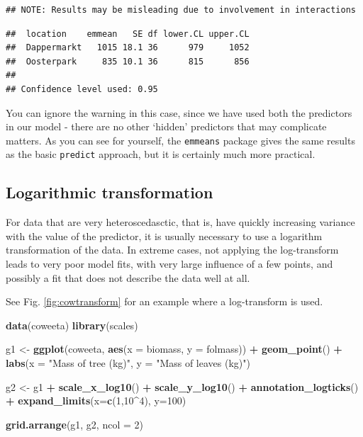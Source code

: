 \documentclass[]{book}
\newenvironment{Shaded}{\begin{snugshade}}{\end{snugshade}}
\newcommand{\DataTypeTok}[1]{\textcolor[rgb]{0.13,0.29,0.53}{#1}}
\newcommand{\DecValTok}[1]{\textcolor[rgb]{0.00,0.00,0.81}{#1}}
\newcommand{\KeywordTok}[1]{\textcolor[rgb]{0.13,0.29,0.53}{\textbf{#1}}}
\newcommand{\NormalTok}[1]{#1}
\newcommand{\OperatorTok}[1]{\textcolor[rgb]{0.81,0.36,0.00}{\textbf{#1}}}
\newcommand{\StringTok}[1]{\textcolor[rgb]{0.31,0.60,0.02}{#1}}
\begin{document}
\begin{verbatim}
## NOTE: Results may be misleading due to involvement in interactions
\end{verbatim}

\begin{verbatim}
##  location    emmean   SE df lower.CL upper.CL
##  Dappermarkt   1015 18.1 36      979     1052
##  Oosterpark     835 10.1 36      815      856
## 
## Confidence level used: 0.95
\end{verbatim}

You can ignore the warning in this case, since we have used both the predictors in our model - there are no other `hidden' predictors that may complicate matters. As you can see for yourself, the \texttt{emmeans} package gives the same results as the basic \texttt{predict} approach, but it is certainly much more practical.

\hypertarget{logtransform}{%
\subsection{Logarithmic transformation}\label{logtransform}}

For data that are very heteroscedasctic, that is, have quickly increasing variance with the value of the predictor, it is usually necessary to use a logarithm transformation of the data. In extreme cases, not applying the log-transform leads to very poor model fits, with very large influence of a few points, and possibly a fit that does not describe the data well at all.

See Fig. \ref{fig:cowtransform} for an example where a log-transform is used.

\begin{Shaded}
\begin{Highlighting}[]
\KeywordTok{data}\NormalTok{(coweeta)}
\KeywordTok{library}\NormalTok{(scales)}

\NormalTok{g1 <-}\StringTok{ }\KeywordTok{ggplot}\NormalTok{(coweeta, }\KeywordTok{aes}\NormalTok{(}\DataTypeTok{x =}\NormalTok{ biomass, }\DataTypeTok{y =}\NormalTok{ folmass)) }\OperatorTok{+}\StringTok{ }
\StringTok{  }\KeywordTok{geom_point}\NormalTok{() }\OperatorTok{+}
\StringTok{  }\KeywordTok{labs}\NormalTok{(}\DataTypeTok{x =} \StringTok{"Mass of tree (kg)"}\NormalTok{, }\DataTypeTok{y =} \StringTok{"Mass of leaves (kg)"}\NormalTok{)}
    
\NormalTok{g2 <-}\StringTok{ }\NormalTok{g1 }\OperatorTok{+}\StringTok{ }
\StringTok{  }\KeywordTok{scale_x_log10}\NormalTok{() }\OperatorTok{+}\StringTok{ }
\StringTok{  }\KeywordTok{scale_y_log10}\NormalTok{() }\OperatorTok{+}
\StringTok{  }\KeywordTok{annotation_logticks}\NormalTok{() }\OperatorTok{+}
\StringTok{  }\KeywordTok{expand_limits}\NormalTok{(}\DataTypeTok{x=}\KeywordTok{c}\NormalTok{(}\DecValTok{1}\NormalTok{,}\DecValTok{10}\OperatorTok{^}\DecValTok{4}\NormalTok{), }\DataTypeTok{y=}\DecValTok{100}\NormalTok{)}

\KeywordTok{grid.arrange}\NormalTok{(g1, g2, }\DataTypeTok{ncol =} \DecValTok{2}\NormalTok{)}
\end{Highlighting}
\end{Shaded}
\end{document}
